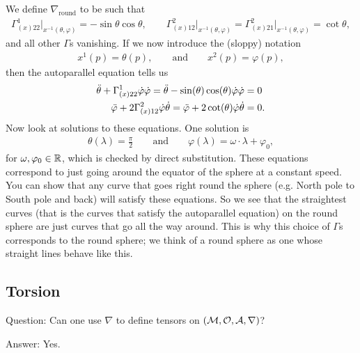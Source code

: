 \documentclass[12pt]{article} %
\begin{document}
    We define $\nabla_{\text{round}}$ to be such that 
    \begin{align*}
        \Gamma^1_{(x)22}\big|_{x^{-1}(\theta,\varphi)} = - \sin\theta \cos\theta, \qquad \Gamma^2_{(x)12}\big|_{x^{-1}(\theta,\varphi)} = \Gamma^2_{(x)21}\big|_{x^{-1}(\theta,\varphi)} = \cot\theta,
    \end{align*}
    and all other $\Gamma$s vanishing. If we now introduce the (sloppy) notation 
    \begin{align*}
        x^1(p) = \theta(p), \qquad \text{and} \qquad x^2(p) = \varphi(p),
    \end{align*}
    then the autoparallel equation tells us 
    \begin{align*}
        \begin{split}
            \Ddot{\theta} + \Gamma^1_{(x)22} \Dot{\varphi}\Dot{\varphi} = \Ddot{\theta} -\sin(\theta)\cos(\theta) \Dot{\varphi}\Dot{\varphi} & = 0 \\
            \Ddot{\varphi} + 2\Gamma^2_{(x)12}\Dot{\varphi}\Dot{\theta} = \Ddot{\varphi} +2\cot(\theta)\Dot{\varphi}\Dot{\theta} & = 0.
        \end{split}
    \end{align*}
    Now look at solutions to these equations. One solution is 
    \begin{align*}
        \theta(\lambda) = \frac{\pi}{2} \qquad \text{and}\qquad \varphi(\lambda) = \omega \cdot \lambda + \varphi_0,
    \end{align*}
    for $\omega,\varphi_0\in\mathbb{R}$, which is checked by direct substitution. These equations correspond to just going around the equator of the sphere at a constant speed. 
    You can show that any curve that goes right round the sphere (e.g. North pole to South pole and back) will satisfy these equations. So we see that the straightest curves (that is the curves that satisfy the autoparallel equation) on the round sphere are just curves that go all the way around. This is why this choice of $\Gamma$s corresponds to the round sphere; we think of a round sphere as one whose straight lines behave like this.
\eex 
\subsection{Torsion}

Question: Can one use $\nabla$ to define tensors on $(\mathcal{M},\mathcal{O},\mathcal{A},\nabla)$? 

Answer: Yes. 
\end{document}
